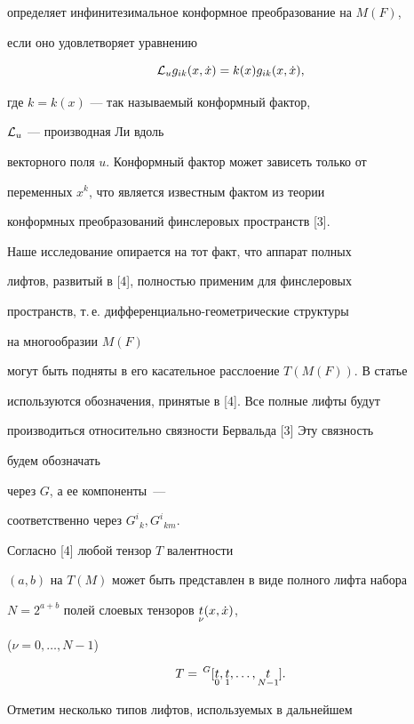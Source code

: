 определяет инфинитезимальное конформное преобразование на $M(F)$,


если оно удовлетворяет уравнению


$$


{\lie}_u{g}_{ik}(x,\xt) =


k(x){g}_{ik}(x,\xt),


$$


где $k = k(x)$ --- так называемый конформный фактор,


${\cal L}_u$ --- производная Ли вдоль


векторного поля $u$. Конформный фактор может зависеть только от


переменных $x^k$, что является известным фактом из теории


конформных преобразований финслеровых пространств [3].





Наше исследование опирается на тот факт, что аппарат полных


лифтов, развитый в [4], полностью применим для финслеровых


пространств, т.\,е. дифференциально-геометрические структуры


на многообразии $M(F)$


могут быть подняты в его касательное расслоение $T(M(F))$. В статье


используются обозначения, принятые в [4]. Все полные лифты будут


производиться относительно связности Бервальда [3] Эту связность


будем обозначать


через $G$, а ее компоненты~---


соответственно через $G^{i}{}_{k}, G^{i}{}_{km}$.


Согласно [4] любой тензор $T$ валентности


$(a,b)$ на $T(M)$ может быть представлен в виде полного лифта набора


$N = 2^{a+b}$ полей слоевых тензоров $\underset{\nu}{t}{}(x,\Dot x)$,


($\nu = 0,\dotsc,N-1$)


$$


T =\,{}^{G}[\sd{t}{0},\sd{t}{1},\dotsc,\sd{t}{N-1}].


$$


Отметим несколько типов лифтов, используемых в дальнейшем


\medskip





